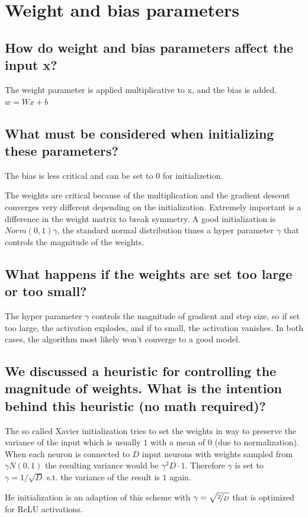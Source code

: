 \section{Weight and bias parameters}
\subsection{How do weight and bias parameters affect the input x?}
The weight parameter is applied multiplicative to x, and the bias is added. $w = Wx+b$
\subsection{What must be considered when initializing these parameters?}
The bias is less critical and can be set to $0$ for initializetion.

The weights are critical because of the multiplication and the gradient descent converges very different depending on the initialization. Extremely important is a difference in the weight matrix to break symmetry. A good  initialization is $Norm(0,1)\gamma$, the standard normal distribution times a hyper parameter $\gamma$ that controls the magnitude of the weights.
\subsection{What happens if the weights are set too large or too small?}
The hyper parameter $\gamma$ controls the magnitude of gradient and step size, so if set too large, the activation explodes, and if to small, the activation vanishes. In both cases, the algorithm most likely won't converge to a good model. 
\subsection{We discussed a heuristic for controlling the magnitude of weights. What is the intention behind this heuristic (no math required)?}
The so called Xavier initialization tries to set the weights in way to preserve the variance of the input which is usually $1$ with a mean of $0$ (due to normalization). When each neuron is connected to $D$ input neurons with weights sampled from $\gamma N(0,1)$ the resulting variance would be $\gamma^2 D\cdot 1$. Therefore $\gamma$ is set to $\gamma= 1/\sqrt{D}$ s.t. the variance of the result is $1$ again. 

He initialization is an adaption of this scheme with $\gamma = \sqrt{\nicefrac 2 D}$ that is optimized for ReLU activations.

